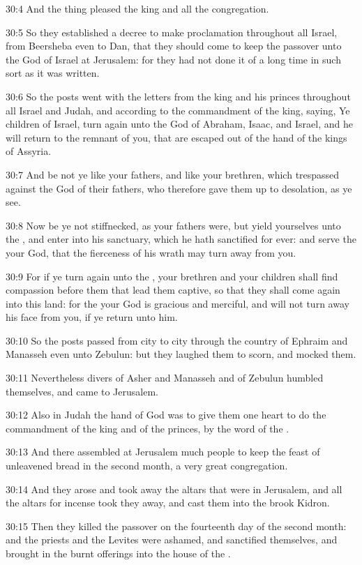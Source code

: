 30:4 And the thing pleased the king and all the congregation.

30:5 So they established a decree to make proclamation throughout all
Israel, from Beersheba even to Dan, that they should come to keep the
passover unto the \LORD God of Israel at Jerusalem: for they had not
done it of a long time in such sort as it was written.

30:6 So the posts went with the letters from the king and his princes
throughout all Israel and Judah, and according to the commandment of
the king, saying, Ye children of Israel, turn again unto the \LORD God
of Abraham, Isaac, and Israel, and he will return to the remnant of
you, that are escaped out of the hand of the kings of Assyria.

30:7 And be not ye like your fathers, and like your brethren, which
trespassed against the \LORD God of their fathers, who therefore gave
them up to desolation, as ye see.

30:8 Now be ye not stiffnecked, as your fathers were, but yield
yourselves unto the \LORD, and enter into his sanctuary, which he hath
sanctified for ever: and serve the \LORD your God, that the fierceness
of his wrath may turn away from you.

30:9 For if ye turn again unto the \LORD, your brethren and your
children shall find compassion before them that lead them captive, so
that they shall come again into this land: for the \LORD your God is
gracious and merciful, and will not turn away his face from you, if ye
return unto him.

30:10 So the posts passed from city to city through the country of
Ephraim and Manasseh even unto Zebulun: but they laughed them to
scorn, and mocked them.

30:11 Nevertheless divers of Asher and Manasseh and of Zebulun humbled
themselves, and came to Jerusalem.

30:12 Also in Judah the hand of God was to give them one heart to do
the commandment of the king and of the princes, by the word of the
\LORD.

30:13 And there assembled at Jerusalem much people to keep the feast
of unleavened bread in the second month, a very great congregation.

30:14 And they arose and took away the altars that were in Jerusalem,
and all the altars for incense took they away, and cast them into the
brook Kidron.

30:15 Then they killed the passover on the fourteenth day of the
second month: and the priests and the Levites were ashamed, and
sanctified themselves, and brought in the burnt offerings into the
house of the \LORD.

